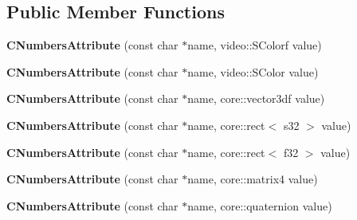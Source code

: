 \subsection*{Public Member Functions}
\begin{DoxyCompactItemize}
\item 
\hypertarget{classirr_1_1io_1_1_c_numbers_attribute_a898a46bfafd6c506749dbfcad5f841cd}{{\bfseries C\-Numbers\-Attribute} (const char $\ast$name, video\-::\-S\-Colorf value)}\label{classirr_1_1io_1_1_c_numbers_attribute_a898a46bfafd6c506749dbfcad5f841cd}

\item 
\hypertarget{classirr_1_1io_1_1_c_numbers_attribute_a949e605d7f368548206548042e119c4d}{{\bfseries C\-Numbers\-Attribute} (const char $\ast$name, video\-::\-S\-Color value)}\label{classirr_1_1io_1_1_c_numbers_attribute_a949e605d7f368548206548042e119c4d}

\item 
\hypertarget{classirr_1_1io_1_1_c_numbers_attribute_a972ac6db576512c839a930a20089a65a}{{\bfseries C\-Numbers\-Attribute} (const char $\ast$name, core\-::vector3df value)}\label{classirr_1_1io_1_1_c_numbers_attribute_a972ac6db576512c839a930a20089a65a}

\item 
\hypertarget{classirr_1_1io_1_1_c_numbers_attribute_ae09a8cdc9a782a50aa38ed51a3ccba12}{{\bfseries C\-Numbers\-Attribute} (const char $\ast$name, core\-::rect$<$ s32 $>$ value)}\label{classirr_1_1io_1_1_c_numbers_attribute_ae09a8cdc9a782a50aa38ed51a3ccba12}

\item 
\hypertarget{classirr_1_1io_1_1_c_numbers_attribute_a552aa368a0e6c9be5eef9e1b8a3e4aaf}{{\bfseries C\-Numbers\-Attribute} (const char $\ast$name, core\-::rect$<$ f32 $>$ value)}\label{classirr_1_1io_1_1_c_numbers_attribute_a552aa368a0e6c9be5eef9e1b8a3e4aaf}

\item 
\hypertarget{classirr_1_1io_1_1_c_numbers_attribute_aa3151df3523b31314378ffb1975a6934}{{\bfseries C\-Numbers\-Attribute} (const char $\ast$name, core\-::matrix4 value)}\label{classirr_1_1io_1_1_c_numbers_attribute_aa3151df3523b31314378ffb1975a6934}

\item 
\hypertarget{classirr_1_1io_1_1_c_numbers_attribute_a4ae4410ca1dc0de34a95c7056ce4916d}{{\bfseries C\-Numbers\-Attribute} (const char $\ast$name, core\-::quaternion value)}\label{classirr_1_1io_1_1_c_numbers_attribute_a4ae4410ca1dc0de34a95c7056ce4916d}


\end{DoxyCompactItemize}

